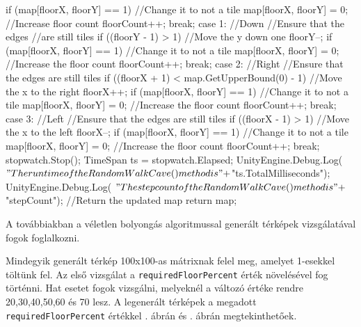 \begin{java}
{{{{                    if (map[floorX, floorY] == 1)
                    {
                        //Change it to not a tile
                        map[floorX, floorY] = 0;
                        //Increase floor count
                        floorCount++;
                    }
                }
                break;
            case 1: //Down
                //Ensure that the edges
                //are still tiles
                if ((floorY - 1) > 1)
                {
                    //Move the y down one
                    floorY--;
                    if (map[floorX, floorY] == 1)
                    {
                        //Change it to not a tile
                        map[floorX, floorY] = 0;
                        //Increase the floor count
                        floorCount++;
                    }
                }
                break;
            case 2: //Right
                //Ensure that the edges are still tiles
                if ((floorX + 1) < 
                    map.GetUpperBound(0) - 1)
                {
                    //Move the x to the right
                    floorX++;
                    if (map[floorX, floorY] == 1)
                    {
                        //Change it to not a tile
                        map[floorX, floorY] = 0;
                        //Increase the floor count
                        floorCount++;
                    }
                }
                break;
            case 3: //Left
                //Ensure that the edges are still tiles
                if ((floorX - 1) > 1)
                {
                    //Move the x to the left
                    floorX--;
                    if (map[floorX, floorY] == 1)
                    {
                        //Change it to not a tile
                        map[floorX, floorY] = 0;
                        //Increase the floor count
                        floorCount++;
                    }
                }
                break;
        }
    }
    stopwatch.Stop();
    TimeSpan ts = stopwatch.Elapsed;
    UnityEngine.Debug.Log(
        $"The runtime of the RandomWalkCave() method is " +
        $"{ts.TotalMilliseconds}");
    UnityEngine.Debug.Log(
        $"The stepcount of the RandomWalkCave() method is " +
        $"{stepCount}");
    //Return the updated map
    return map;
}
\end{java}

A továbbiakban a véletlen bolyongás algoritmussal generált térképek vizsgálatával fogok foglalkozni.

Mindegyik generált térkép 100x100-as mátrixnak felel meg, amelyet 1-esekkel töltünk fel. Az első vizsgálat a \texttt{requiredFloorPercent} érték növelésével fog történni. Hat esetet fogok vizsgálni, melyeknél a változó értéke rendre 20,30,40,50,60 és 70 lesz. A legenerált térképek a megadott \texttt{requiredFloorPercent} értékkel . ábrán és . ábrán megtekinthetőek.

